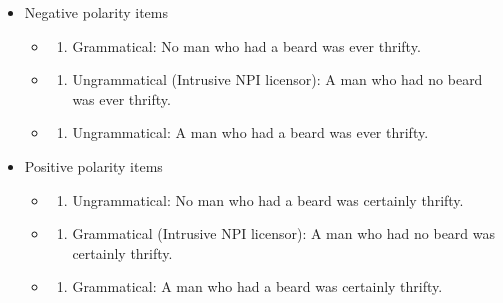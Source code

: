 \documentclass[
  12pt,
]{krantz}
\providecommand{\tightlist}{%
  \setlength{\itemsep}{0pt}\setlength{\parskip}{0pt}}
\theoremstyle{definition}
\theoremstyle{definition}
\theoremstyle{definition}
\theoremstyle{definition}
\theoremstyle{remark}
\begin{document}
\begin{itemize}
\tightlist
\item
  Negative polarity items

  \begin{itemize}
  \item
    \begin{enumerate}
    \def\labelenumi{(\alph{enumi})}
    \tightlist
    \item
      Grammatical: No man who had a beard was ever thrifty.
    \end{enumerate}
  \item
    \begin{enumerate}
    \def\labelenumi{(\alph{enumi})}
    \setcounter{enumi}{1}
    \tightlist
    \item
      Ungrammatical (Intrusive NPI licensor): A man who had no beard was ever thrifty.
    \end{enumerate}
  \item
    \begin{enumerate}
    \def\labelenumi{(\alph{enumi})}
    \setcounter{enumi}{2}
    \tightlist
    \item
      Ungrammatical: A man who had a beard was ever thrifty.
    \end{enumerate}
  \end{itemize}
\item
  Positive polarity items

  \begin{itemize}
  \item
    \begin{enumerate}
    \def\labelenumi{(\alph{enumi})}
    \setcounter{enumi}{3}
    \tightlist
    \item
      Ungrammatical: No man who had a beard was certainly thrifty.
    \end{enumerate}
  \item
    \begin{enumerate}
    \def\labelenumi{(\alph{enumi})}
    \setcounter{enumi}{4}
    \tightlist
    \item
      Grammatical (Intrusive NPI licensor): A man who had no beard was certainly thrifty.
    \end{enumerate}
  \item
    \begin{enumerate}
    \def\labelenumi{(\alph{enumi})}
    \setcounter{enumi}{5}
    \tightlist
    \item
      Grammatical: A man who had a beard was certainly thrifty.
    \end{enumerate}
  \end{itemize}
\end{itemize}
\end{document}
